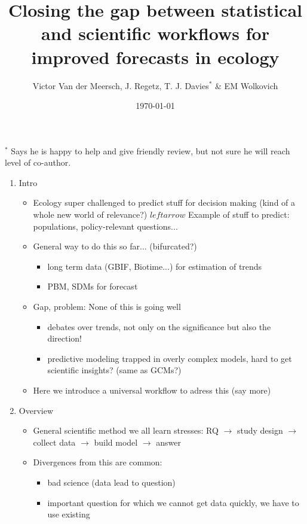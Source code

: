 \documentclass[11pt]{article}
\begin{document}
\renewcommand{\refname}{\CHead{}}

\title{Closing the gap between statistical and scientific workflows for improved forecasts in ecology } 
\date{\today}
\author{Victor Van der Meersch, J. Regetz, T. J. Davies$^*$ \& EM Wolkovich}
\maketitle
$^*$ Says he is happy to help and give friendly review, but not sure he will reach level of co-author. 

\begin{enumerate}
\item Intro
\begin{itemize}
\item Ecology super challenged to predict stuff for decision making (kind of a whole new world of relevance?)
$leftarrow$ Example of stuff to predict: populations, policy-relevant questions...
\item General way to do this so far... (bifurcated?)
\begin{itemize}
\item long term data (GBIF, Biotime...) for estimation of trends
\item PBM, SDMs for forecast
\end{itemize}
\item Gap, problem: None of this is going well
\begin{itemize}
\item debates over trends, not only on the significance but also the direction!
\item predictive modeling trapped in overly complex models, hard to get scientific insights? (same as GCMs?)
\end{itemize}
\item Here we introduce a universal workflow to adress this (say more)
\end{itemize}
\item Overview
\begin{itemize}
\item General scientific method we all learn stresses: RQ $\rightarrow$ study design $\rightarrow$ collect data $\rightarrow$ build model $\rightarrow$ answer
\item Divergences from this are common: 
\begin{itemize}
\item bad science (data lead to question)
\item important question for which we cannot get data quickly, we have to use existing

\end{itemize}
\end{itemize}
\end{enumerate}
\end{document}
